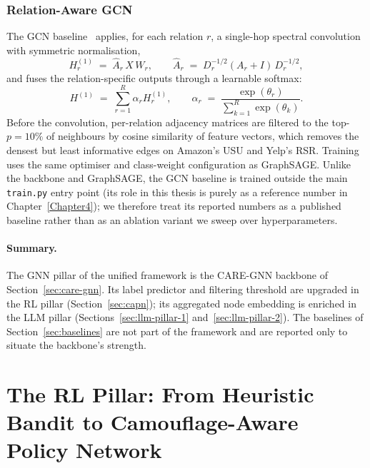\subsubsection{Relation-Aware GCN}

The GCN baseline~\cite{kipf2017semi} applies, for each relation $r$, a single-hop spectral convolution with symmetric normalisation,
\begin{equation}
H^{(1)}_r \;=\; \hat{A}_r\, X\, W_r,\qquad
\hat{A}_r \;=\; D_r^{-1/2} (A_r + I)\, D_r^{-1/2},
\end{equation}
and fuses the relation-specific outputs through a learnable softmax:
\begin{equation}
H^{(1)} \;=\; \sum_{r=1}^{R} \alpha_r H^{(1)}_r,\qquad
\alpha_r \;=\; \frac{\exp(\theta_r)}{\sum_{k=1}^{R}\exp(\theta_k)}.
\end{equation}
Before the convolution, per-relation adjacency matrices are filtered to the top-$p=10\%$ of neighbours by cosine similarity of feature vectors, which removes the densest but least informative edges on Amazon's USU and Yelp's RSR. Training uses the same optimiser and class-weight configuration as GraphSAGE. Unlike the backbone and GraphSAGE, the GCN baseline is trained outside the main \texttt{train.py} entry point (its role in this thesis is purely as a reference number in Chapter~\ref{Chapter4}); we therefore treat its reported numbers as a published baseline rather than as an ablation variant we sweep over hyperparameters.

\paragraph{Summary.} The GNN pillar of the unified framework is the CARE-GNN backbone of Section~\ref{sec:care-gnn}. Its label predictor and filtering threshold are upgraded in the RL pillar (Section~\ref{sec:capn}); its aggregated node embedding is enriched in the LLM pillar (Sections~\ref{sec:llm-pillar-1} and~\ref{sec:llm-pillar-2}). The baselines of Section~\ref{sec:baselines} are not part of the framework and are reported only to situate the backbone's strength.


\section{The RL Pillar: From Heuristic Bandit to Camouflage-Aware Policy Network}
\label{sec:rl-pillar}
\label{sec:capn}

